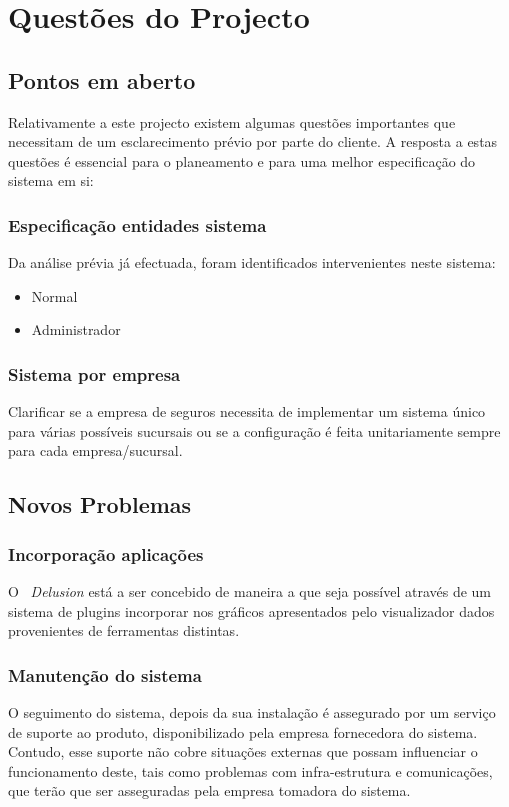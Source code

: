 \chapter{Questões do Projecto}
\minitoc
\section{Pontos em aberto}
Relativamente a este projecto existem algumas questões importantes que necessitam de um esclarecimento prévio por parte do cliente.
A resposta a estas questões é essencial para o planeamento e para uma melhor especificação do sistema em si:

\subsection{Especificação entidades sistema}
Da análise prévia já efectuada, foram identificados intervenientes neste sistema:

\begin{itemize} 
\item Normal
\item Administrador
\end{itemize}


\subsection{Sistema por empresa}
Clarificar se a empresa de seguros necessita de implementar um sistema único para várias possíveis sucursais ou se a configuração é feita unitariamente sempre para cada empresa/sucursal.


\section{Novos Problemas}

\subsection{Incorporação aplicações}

O ~\textit{Delusion} está a ser concebido de maneira a que seja possível através de um sistema de plugins incorporar nos gráficos apresentados pelo visualizador dados provenientes de ferramentas distintas.

\subsection{Manutenção do sistema}
O seguimento do sistema, depois da sua instalação é assegurado por um serviço de suporte ao produto, disponibilizado pela empresa fornecedora do sistema. Contudo, esse suporte não cobre situações externas que possam influenciar o funcionamento deste, tais como problemas com infra-estrutura e comunicações, que terão que ser asseguradas pela empresa tomadora do sistema. 

